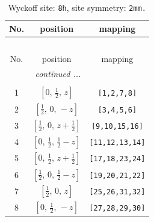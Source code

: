 \documentclass[fleqn,8pt]{jsarticle}
\begin{document}
\begin{longtable}{ccc}
\caption{Wyckoff site: {\tt 8h}, site symmetry: {\tt 2mm.}}
 \\
 \hline \hline
No. & position & mapping \\ \hline \endfirsthead

\multicolumn{2}{l}{\tablename\ \thetable{}} \\
 \hline \hline
No. & position & mapping \\ \hline \endhead

 \hline \hline
\multicolumn{2}{r}{\footnotesize\it continued ...} \\ \endfoot

 \hline \hline
\multicolumn{2}{r}{} \\ \endlastfoot

1 & $\left[ 0,\, \frac{1}{2},\, z \right]$ & {\tt [1,2,7,8]} \\ \hline
2 & $\left[ \frac{1}{2},\, 0,\, - z \right]$ & {\tt [3,4,5,6]} \\ \hline
3 & $\left[ \frac{1}{2},\, 0,\, z + \frac{1}{2} \right]$ & {\tt [9,10,15,16]} \\ \hline
4 & $\left[ 0,\, \frac{1}{2},\, \frac{1}{2} - z \right]$ & {\tt [11,12,13,14]} \\ \hline
5 & $\left[ 0,\, \frac{1}{2},\, z + \frac{1}{2} \right]$ & {\tt [17,18,23,24]} \\ \hline
6 & $\left[ \frac{1}{2},\, 0,\, \frac{1}{2} - z \right]$ & {\tt [19,20,21,22]} \\ \hline
7 & $\left[ \frac{1}{2},\, 0,\, z \right]$ & {\tt [25,26,31,32]} \\ \hline
8 & $\left[ 0,\, \frac{1}{2},\, - z \right]$ & {\tt [27,28,29,30]} \\
\end{longtable}
\renewcommand{\arraystretch}{1.2}
\end{document}
